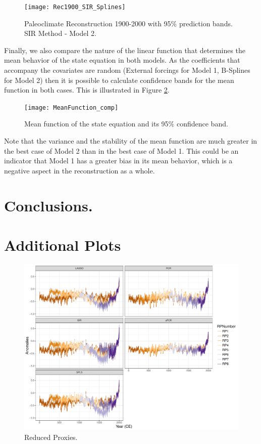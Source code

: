 \documentclass[11pt]{amsart}
\theoremstyle{plain}
\theoremstyle{definition}
\theoremstyle{remark}
\begin{document}
\begin{figure}
  \centering
  \texttt{[image: Rec1900\_SIR\_Splines]}
  \caption{Paleoclimate Reconstruction 1900-2000 with 95\%
    prediction bands. SIR Method - Model 2.}
  \label{fig:paleo19001}
\end{figure}

Finally, we also compare the nature of the linear function that determines the
mean behavior of the state equation in both models. As the coefficients that
accompany the covariates are random (External forcings for Model 1, B-Splines
for Model 2) then it is possible to calculate confidence bands for the mean
function in both cases. This is illustrated in Figure \ref{fig:meanfunction}.
\begin{figure}
  \centering
  \texttt{[image: MeanFunction\_comp]}
  \caption{Mean function of the state equation and its 95\% confidence band.}
  \label{fig:meanfunction}
\end{figure}
Note that the variance and the stability of the mean function are much greater
in the best case of Model 2 than in the best case of Model 1. This could be an
indicator that Model 1 has a greater bias in its mean behavior, which is a
negative aspect in the reconstruction as a whole.
\section{Conclusions.}
\label{sec:conclusions}






\newpage
\appendix

\section{Additional Plots}
\begin{figure}[H]
  \centering
 \includegraphics[scale=0.4]{RPs_type} 
  \caption{Reduced Proxies.}
  \label{fig:RPs}
\end{figure}
\end{document}
